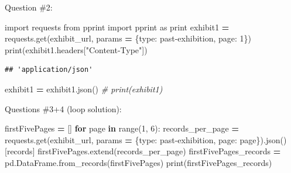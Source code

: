 \documentclass[
]{book}
\newenvironment{Shaded}{\begin{snugshade}}{\end{snugshade}}
\newcommand{\BuiltInTok}[1]{#1}
\newcommand{\CommentTok}[1]{\textcolor[rgb]{0.56,0.35,0.01}{\textit{#1}}}
\newcommand{\ControlFlowTok}[1]{\textcolor[rgb]{0.13,0.29,0.53}{\textbf{#1}}}
\newcommand{\DecValTok}[1]{\textcolor[rgb]{0.00,0.00,0.81}{#1}}
\newcommand{\ImportTok}[1]{#1}
\newcommand{\KeywordTok}[1]{\textcolor[rgb]{0.13,0.29,0.53}{\textbf{#1}}}
\newcommand{\NormalTok}[1]{#1}
\newcommand{\OperatorTok}[1]{\textcolor[rgb]{0.81,0.36,0.00}{\textbf{#1}}}
\newcommand{\StringTok}[1]{\textcolor[rgb]{0.31,0.60,0.02}{#1}}
\begin{document}
Question \#2:

\begin{Shaded}
\begin{Highlighting}[]
\ImportTok{import}\NormalTok{ requests}
\ImportTok{from}\NormalTok{ pprint }\ImportTok{import}\NormalTok{ pprint }\ImportTok{as} \BuiltInTok{print} 
\NormalTok{exhibit1 }\OperatorTok{=}\NormalTok{ requests.get(exhibit\_url, params }\OperatorTok{=}\NormalTok{ \{}\StringTok{\textquotesingle{}type\textquotesingle{}}\NormalTok{: }\StringTok{\textquotesingle{}past{-}exhibition\textquotesingle{}}\NormalTok{, }\StringTok{\textquotesingle{}page\textquotesingle{}}\NormalTok{: }\DecValTok{1}\NormalTok{\})}
\BuiltInTok{print}\NormalTok{(exhibit1.headers[}\StringTok{"Content{-}Type"}\NormalTok{])}
\end{Highlighting}
\end{Shaded}

\begin{verbatim}
## 'application/json'
\end{verbatim}

\begin{Shaded}
\begin{Highlighting}[]
\NormalTok{exhibit1 }\OperatorTok{=}\NormalTok{ exhibit1.json()}
\CommentTok{\# print(exhibit1)}
\end{Highlighting}
\end{Shaded}

Questions \#3+4 (loop solution):

\begin{Shaded}
\begin{Highlighting}[]
\NormalTok{firstFivePages }\OperatorTok{=}\NormalTok{ []}
\ControlFlowTok{for}\NormalTok{ page }\KeywordTok{in} \BuiltInTok{range}\NormalTok{(}\DecValTok{1}\NormalTok{, }\DecValTok{6}\NormalTok{):}
\NormalTok{    records\_per\_page }\OperatorTok{=}\NormalTok{ requests.get(exhibit\_url, params }\OperatorTok{=}\NormalTok{ \{}\StringTok{\textquotesingle{}type\textquotesingle{}}\NormalTok{: }\StringTok{\textquotesingle{}past{-}exhibition\textquotesingle{}}\NormalTok{, }\StringTok{\textquotesingle{}page\textquotesingle{}}\NormalTok{: page\}).json()[}\StringTok{\textquotesingle{}records\textquotesingle{}}\NormalTok{]}
\NormalTok{    firstFivePages.extend(records\_per\_page)}
\NormalTok{firstFivePages\_records }\OperatorTok{=}\NormalTok{ pd.DataFrame.from\_records(firstFivePages)}
\BuiltInTok{print}\NormalTok{(firstFivePages\_records)}
\end{Highlighting}
\end{Shaded}
\end{document}
